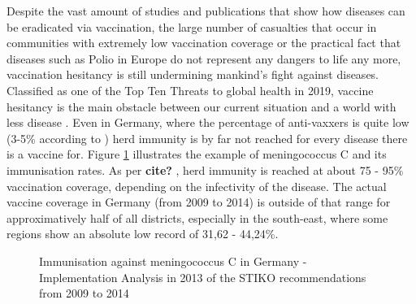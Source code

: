 \documentclass[12pt,a4paper,twoside]{article}
\begin{document}
Despite the vast amount of studies and publications that show how diseases can be eradicated via vaccination, the large number of casualties that occur in communities with extremely low vaccination coverage or the practical fact that diseases such as Polio in Europe do not represent any dangers to life any more, vaccination hesitancy is still undermining mankind's fight against diseases. Classified as one of the Top Ten Threats to global health in 2019, vaccine hesitancy is the main obstacle between our current situation and a world with less disease \cite{WHOAkbar2019}. Even in Germany, where the percentage of anti-vaxxers is quite low (3-5\% according to \cite{Meyer2004}) herd immunity is by far not reached for every disease there is a vaccine for. Figure \ref{fig:impfkarte_meningokokken} illustrates the example of meningococcus C and its immunisation rates. As per \textbf{cite?}%
, herd immunity is reached at about 75 - 95\% vaccination coverage, depending on the infectivity of the disease. The actual vaccine coverage in Germany (from 2009 to 2014) is outside of that range for approximatively half of all districts, especially in the south-east, where some regions show an absolute low record of 31,62 - 44,24\%.

\begin{figure}[h!]
	\centering
	\caption{Immunisation against meningococcus C in Germany - Implementation Analysis in 2013 of the \ac{STIKO} recommendations from 2009 to 2014 \cite{LamegoGreinerMGoffrierB2016}}
	\label{fig:impfkarte_meningokokken}
	\def\svgwidth{350pt}
	
\end{figure}
\end{document}
